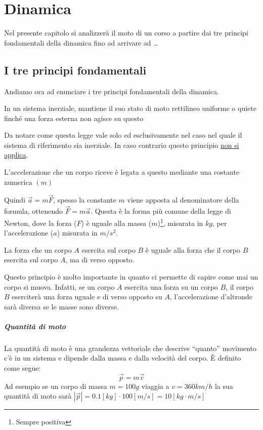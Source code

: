 \chapter{Dinamica}
\label{chap:dinamica}

Nel presente capitolo si analizzerà il moto di un corso a partire dai tre principi fondamentali della dinamica fino ad arrivare ad \dots

\section{I tre principi fondamentali}
    Andiamo ora ad enunciare i tre principi fondamentali della dinamica.
    \begin{law}
        In un sistema inerziale, mantiene il suo stato di moto rettilineo uniforme o quiete finché una forza esterna non agisce su questo
    \end{law}
    Da notare come questa legge vale solo ed esclusivamente nel caso nel quale il sistema di riferimento sia inerziale. In caso contrario questo principio \underline{non si applica}.
    \begin{law}
        \label{law:principio-newton}
        L'accelerazione che un corpo riceve è legata a questo mediante una costante numerica $(m)$
    \end{law}
    Quindi $ \vec{a}=m\vec{F}$, spesso la constante $m$ viene apposta al denominatore della formula, ottenendo $ \vec{F}=m\vec{a}$. Questa è la forma più comune della legge di Newton, dove la forza ($F$) è uguale alla massa ($m$)\footnote{Sempre positiva}, misurata in $kg$, per l'accelerazione ($a$) misurata in $m/s^2$.
    \begin{law}
        La forza che un corpo $A$ esercita sul corpo $B$ è uguale alla forza che il corpo $B$ esercita sul corpo $A$, ma di verso opposto.
    \end{law}
    Questo principio è molto importante in quanto ci permette di capire come mai un corpo si muova. Infatti, se un corpo $A$ esercita una forza su un corpo $B$, il corpo $B$ eserciterà una forza uguale e di verso opposto su $A$, l'accelerazione d'altronde sarà diversa se le masse sono diverse.
    \paragraph{Quantità di moto}
        La quantità di moto è una grandezza vettoriale che descrive ``quanto'' movimento c'è in un sistema e dipende dalla massa e dalla velocità del corpo. È definito come segue:
        $$
            \vec{p}=m\vec{v}
        $$
        Ad esempio se un corpo di massa $m=100g$ viaggia a $v=360km/h$ la sua quantità di moto sarà $|\vec{p}|=0.1 [kg] \cdot 100 [m/s] = 10 [kg \cdot m/s]$
